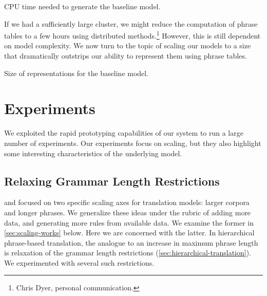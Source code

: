 \figpreamble
\begin{table}
	\begin{center}
		
	\end{center}
	\figpostamble
	\caption{CPU time needed to generate the baseline model.}
	\label{table:startup-time}
\end{table}

If we had a sufficiently large cluster, we might reduce the computation
of phrase tables to a few hours using distributed 
methods.\footnote{Chris Dyer, personal communication.}  However,
this is still dependent on model complexity.
We now turn to the topic of scaling our models to a size
that dramatically outstrips our ability to 
represent them using phrase tables.

\figpreamble
\begin{table}
	\begin{center}
		
	\end{center}
	\figpostamble
	\caption{Size of representations for the baseline model.}
	\label{table:representation-size}
\end{table}

\section{Experiments}

We exploited the rapid prototyping capabilities of our
system to run a large number of experiments.  Our experiments
focus on scaling, but they also highlight
some interesting characteristics of the 
underlying model.

\subsection{Relaxing Grammar Length Restrictions}\label{sec:longer-phrases}

\citet{Callison-Burch:2005:acl} and \citet{Zhang:2005:eamt} focused on
two specific scaling axes for translation models: larger corpora and
longer phrases.  We generalize these ideas under the rubric of adding
more data, and generating more rules from available data.  We examine
the former in \textsection\ref{sec:scaling-works} below.  Here
we are concerned with the latter.  In hierarchical
phrase-based translation, the analogue to an increase in maximum
phrase length is relaxation of the grammar length restrictions
(\textsection\ref{sec:hierarchical-translation}).
We experimented with several such restrictions.

